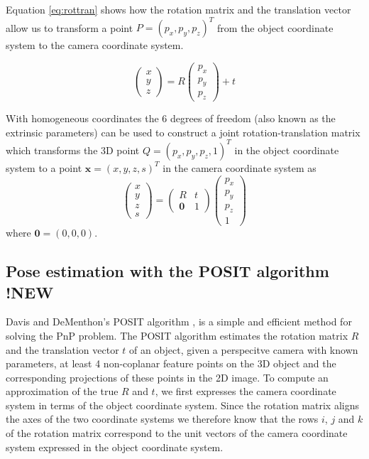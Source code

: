 \documentclass[11pt,a4paper]{report}
\begin{document}
Equation \ref{eq:rottran} shows how the rotation matrix and the translation vector allow us to transform a point $P
= (p_x,p_y,p_z)^T$
from the object coordinate system to the camera coordinate system. 

\begin{equation}\label{eq:rottran}
\begin{pmatrix}x\\y\\z\end{pmatrix} =
  R\begin{pmatrix}p_x\\p_y\\p_z\end{pmatrix} + t
\end{equation}

With homogeneous coordinates the 6 degrees of freedom (also known as the
extrinsic parameters) can be used to
construct a joint rotation-translation matrix which transforms the 3D point
$Q = (p_x,p_y,p_z,1)^T$ in the object coordinate system to a point $\mathbf{x}
= (x,y,z,s)^T$ in the camera coordinate system as
\begin{equation}\label{eq:jointrottran}
\begin{pmatrix}x\\y\\z\\s\end{pmatrix} =
  \begin{pmatrix}R&t\\\mathbf{0}&1\end{pmatrix}\begin{pmatrix}p_x\\p_y\\p_z\\1\end{pmatrix}
\end{equation}
where $\mathbf{0} = (0,0,0)$. 


\subsection{Pose estimation with the POSIT algorithm !NEW}\label{posit}
Davis and DeMenthon's POSIT algorithm \cite{POSIT}, \cite{opencv} is a simple and efficient method for solving the PnP
problem. The POSIT algorithm estimates the rotation matrix $R$ and the
translation vector $t$
of an object, given a perspecitve camera with known parameters, at least 4 non-coplanar feature points on the 3D object and the corresponding
projections of these points in the 2D image. To compute an approximation of the
true $R$ and $t$, we first expresses the camera coordinate system in terms of
the object coordinate system. Since the rotation matrix aligns the axes of the
two coordinate systems we therefore know that the rows $i$, $j$ and $k$ of the
rotation matrix correspond to the unit vectors of the camera coordinate
system expressed in the object coordinate system. 
\end{document}
